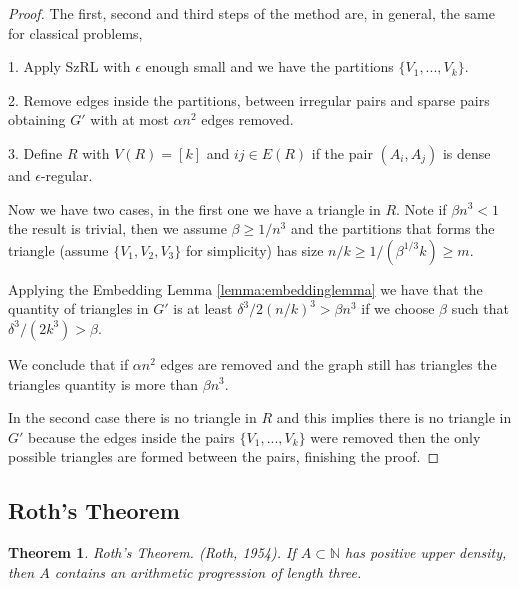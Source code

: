 \documentclass[12pt,twoside,a4paper]{book}
\numberwithin{equation}{section}
\newtheorem{theorem}             {Theorem}[section]
\theoremstyle{remark}
\begin{document}
\begin{proof}
The first, second and third steps of the method are, in general, the same for classical problems,

1. Apply SzRL with $\epsilon$ enough small and we have the partitions $\{V_1, ... , V_k\}$.

2. Remove edges inside the partitions, between irregular pairs and sparse pairs obtaining $G'$ with at most $\alpha n^2$ edges removed.

3. Define $R$ with $V(R) = [k]$ and $ij \in E(R) $ if  the pair $(A_i, A_j)$ is dense and $\epsilon$-regular.

Now we have two cases, in the first one we have a triangle in $R$. Note if $\beta n^3 < 1$ the result is trivial, then we assume $\beta \geq 1/n^3$ and the partitions that forms the triangle (assume $\{V_1, V_2, V_3\}$ for simplicity) has size $n/k \geq 1/(\beta ^{1/3} k) \geq m$.

Applying the Embedding Lemma \ref{lemma:embeddinglemma} we have that the quantity of triangles in $G'$ is at least $\delta ^3 /2 (n/k)^3 > \beta n^3$ if we choose $\beta$ such that $\delta ^3 / (2k^3) > \beta$.

We conclude that if $\alpha n^2$ edges are removed and the graph still has triangles the triangles quantity is more than $\beta n^3$.

In the second case there is no triangle in $R$ and this implies there is no triangle in $G'$ because the edges inside the pairs $\{V_1, ... , V_k\}$ were removed then the only possible triangles are formed between the pairs, finishing the proof.
\end{proof}


\subsection{Roth's Theorem}

\begin{theorem} Roth's Theorem.
(Roth, 1954). If $A \subset \mathbb{N} $ has positive upper density, then $A$ contains an arithmetic progression of length three. 
\end{theorem}
\end{document}
